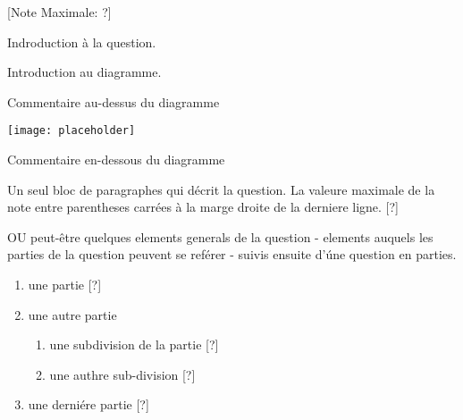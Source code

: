 \begin{question}
  \hspace*{\fill} [Note Maximale: ?]\par
  \medskip
  \noindent Indroduction à la question.\par
  \medskip
  \noindent Introduction au diagramme.\par
  \medskip
  \begin{center} %
    \noindent Commentaire au-dessus du diagramme\par
    \texttt{[image: placeholder]}\par
    \noindent Commentaire en-dessous du diagramme\par
  \end{center} %

  \medskip
  \noindent Un seul bloc de paragraphes qui décrit la question.  La valeure maximale de la note entre parentheses carrées à la marge droite de la derniere ligne.\hspace*{\fill} [?]\par
  
 
  \noindent OU peut-être quelques elements generals de la question - elements auquels les parties de la question peuvent se reférer - suivis ensuite d'úne question en parties.\par
  \begin{enumerate}[label=(\alph*)]
    \item une partie\hspace*{\fill} [?]
    \item une autre partie
      \begin{enumerate}[label=(\roman*)]
        \item une subdivision de la partie\hspace*{\fill} [?] %
        \item une authre sub-division\hspace*{\fill} [?]
      \end{enumerate}
    \item une derniére partie\hspace*{\fill} [?]
  \end{enumerate}
\end{question}
